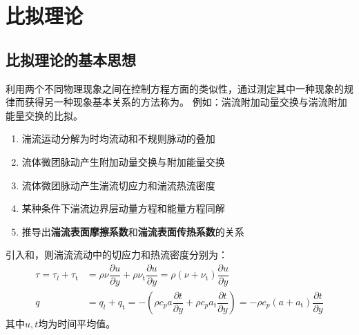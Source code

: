 \section{比拟理论}
\subsection{比拟理论的基本思想}
\vspace*{-1.5em}
利用两个不同物理现象之间在控制方程方面的类似性，通过测定其中一种现象的规律而获得另一种现象基本关系的方法称为。
例如：湍流附加动量交换与湍流附加能量交换的比拟。
\begin{enumerate}[\hspace*{2em}1. ]
	\item 湍流运动分解为时均流动和不规则脉动的叠加
\vspace*{-0.5em}
	\item 流体微团脉动产生附加动量交换与附加能量交换
\vspace*{-0.5em}
	\item 流体微团脉动产生湍流切应力和湍流热流密度
\vspace*{-0.5em}
	\item 某种条件下湍流边界层动量方程和能量方程同解
\vspace*{-0.5em}
	\item 推导出\textbf{湍流表面摩擦系数}和\textbf{湍流表面传热系数}的关系
\end{enumerate}

引入和，则湍流流动中的切应力和热流密度分别为：
\begin{align}
	\tau = \tau_l + \tau_{\text{t}} &= \rho \nu\dfrac{\partial u}{\partial y} + \rho \nu_\text{t}\dfrac{\partial u}{\partial y} = \rho(\nu + \nu_\text{t})\dfrac{\partial u}{\partial y}\\[0.5em]
	q &= q_l + q_\text{t}= -\left(\rho c_p a \dfrac{\partial t}{\partial y} + \rho c_p a_\text{t}\dfrac{\partial  t}{\partial y}\right)= - \rho c_p (a + a_\text{t})\dfrac{\partial t}{\partial y}
\end{align}
其中$u,t$均为时间平均值。

